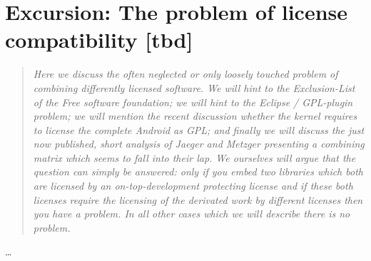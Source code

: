 %
%
%
%
%



\section{Excursion: The problem of license compatibility [tbd]}
\footnotesize
\begin{quote}\itshape
Here we discuss the often neglected or only loosely touched problem of combining
differently licensed software. We will hint to the Exclusion-List of the Free
software foundation; we will hint to the Eclipse / GPL-plugin problem; we will
mention the recent discussion whether the kernel requires to license the
complete Android as GPL; and finally we will discuss the just now published, short
analysis of Jaeger and Metzger presenting a combining matrix which seems to fall
into their lap. We ourselves will argue that the question can simply be answered:
only if you embed two libraries which both are licensed by an
on-top-development protecting license and if these both licenses require the
licensing of the derivated work by different licenses then you have a problem.
In all other cases which we will describe there is no problem.
\end{quote}
\normalsize
\ldots

%
